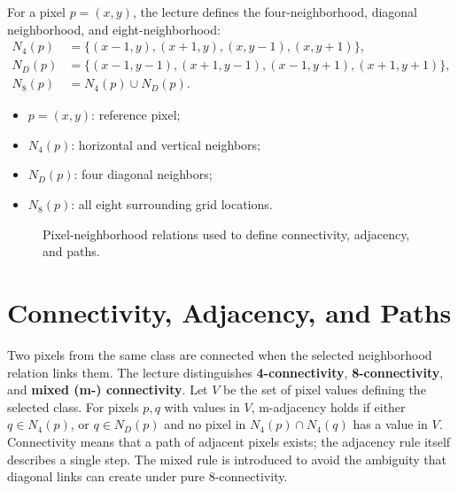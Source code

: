 \documentclass[11pt,a4paper,oneside]{report}
\newcommand{\mathlegend}[1]{%
  \par\vspace{0.2em}{\small\itshape where}\par
  \begin{itemize}[leftmargin=1.7em,topsep=0.15em,itemsep=0.12em]
  #1
  \end{itemize}
}
\begin{document}
For a pixel $p=(x,y)$, the lecture defines the four-neighborhood, diagonal neighborhood, and eight-neighborhood:
\begin{align}
N_4(p) &= \{(x-1,y),(x+1,y),(x,y-1),(x,y+1)\},\label{eq:n4}\\
N_D(p) &= \{(x-1,y-1),(x+1,y-1),(x-1,y+1),(x+1,y+1)\},\label{eq:nd}\\
N_8(p) &= N_4(p)\cup N_D(p).\label{eq:n8}
\end{align}
\mathlegend{
  \item $p=(x,y)$: reference pixel;
  \item $N_4(p)$: horizontal and vertical neighbors;
  \item $N_D(p)$: four diagonal neighbors;
  \item $N_8(p)$: all eight surrounding grid locations.
}

\begin{figure}[!htbp]
\centering
{}
\caption{Pixel-neighborhood relations used to define connectivity, adjacency, and paths.}
\label{fig:pixel-neighborhoods}
\end{figure}

\section{Connectivity, Adjacency, and Paths}

Two pixels from the same class are connected when the selected neighborhood relation links them. The lecture distinguishes \textbf{4-connectivity}, \textbf{8-connectivity}, and \textbf{mixed (m-) connectivity}. Let $V$ be the set of pixel values defining the selected class. For pixels $p,q$ with values in $V$, m-adjacency holds if either $q\in N_4(p)$, or $q\in N_D(p)$ and no pixel in $N_4(p)\cap N_4(q)$ has a value in $V$. Connectivity means that a path of adjacent pixels exists; the adjacency rule itself describes a single step. The mixed rule is introduced to avoid the ambiguity that diagonal links can create under pure 8-connectivity.
\end{document}
